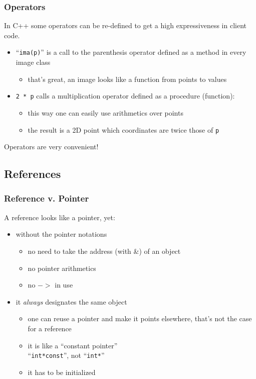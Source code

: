 \documentclass{beamer}
\newcommand{\cpp}{{C++}\xspace}
\newcommand{\code}[1]{{\scriptsize{\texttt{#1}}}\xspace}
\newcommand{\var}[1]{\texttt{#1}\xspace}
\begin{document}
\begin{frame}
  \frametitle{Operators}

  In \cpp some operators can be re-defined to get a high
  expressiveness in client code.

  \begin{itemize}
  \item ``\code{ima(p)}'' is a call to the parenthesis operator
    defined as a method in every image class
    \begin{itemize}
    \item that's great, an image looks like a function from points to
      values
    \end{itemize}
    \smallskip
  \item \code{2 * p} calls a multiplication operator defined as a
    procedure (function):
    \begin{itemize}
    \item this way one can easily use arithmetics over points
    \item the result is a 2D point which coordinates are twice those of \var{p}
    \end{itemize}
  \end{itemize}

  Operators are very convenient!

\end{frame}



\subsection{References}


\begin{frame}
  \frametitle{Reference v. Pointer}

  A reference looks like a pointer, yet:
  \begin{itemize}
  \item without the pointer notations
    \begin{itemize}
    \item no need to take the address (with \&) of an object
    \item no pointer arithmetics
    \item no $->$ in use
    \end{itemize}
  \item it \emph{always} designates the same object
    \begin{itemize}
    \item one can reuse a pointer and make it points elsewhere, that's
      not the case for a reference
    \item it is like a ``constant pointer''\\
      ``\code{int*const}'', not ``\code{int*}''
    \item it has to be initialized
    \end{itemize}
  \end{itemize}

\end{frame}
\end{document}
